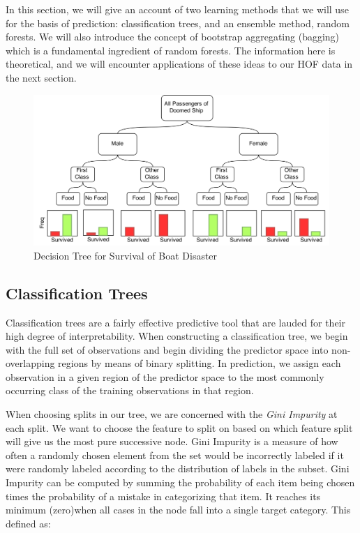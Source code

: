 \documentclass[preprint,12pt]{elsarticle}
\begin{document}
In this section, we will give an account of two learning methods that we will use for the basis of prediction: classification trees, and an ensemble method, random forests. We will also introduce the concept of bootstrap aggregating (bagging) which is a fundamental ingredient of random forests. The information here is theoretical, and we will encounter applications of these ideas to our HOF data in the next section.
\begin{figure}[h]
	\centering
	\includegraphics[width=1\textwidth]{TreeExample}
	\caption{Decision Tree for Survival of Boat Disaster}
	\label{fig:SampleTree}
\end{figure}
\subsection{Classification Trees}
Classification trees are a fairly effective predictive tool that are lauded for their high degree of interpretability. When constructing a classification tree, we begin with the full set of observations and begin dividing the predictor space into non-overlapping regions by means of binary splitting. In prediction, we assign each observation in a given region of the predictor space to the most commonly occurring class of the training observations in that region. 

When choosing splits in our tree, we are concerned with the \textit{Gini Impurity} at each split. We want to choose the feature to split on based on which feature split will give us the most pure successive node. Gini Impurity is a measure of how often a randomly chosen element from the set would be incorrectly labeled if it were randomly labeled according to the distribution of labels in the subset. Gini Impurity can be computed by summing the probability of each item being chosen times the probability of a mistake in categorizing that item. It reaches its minimum (zero)when all cases in the node fall into a single target category. This defined as:
\end{document}
